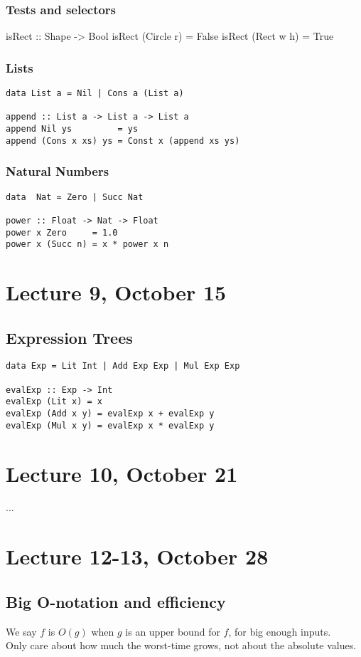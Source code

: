 \documentclass{article}
\begin{document}
\subsubsection{Tests and selectors}
isRect :: Shape -> Bool
isRect (Circle r) = False
isRect (Rect w h) = True
\subsubsection{Lists}
\begin{verbatim}
data List a = Nil | Cons a (List a)

append :: List a -> List a -> List a
append Nil ys         = ys
append (Cons x xs) ys = Const x (append xs ys)
\end{verbatim}
\subsubsection{Natural Numbers}
\begin{verbatim}
data  Nat = Zero | Succ Nat

power :: Float -> Nat -> Float
power x Zero     = 1.0
power x (Succ n) = x * power x n
\end{verbatim}
\section{Lecture 9, October 15}
\subsection{Expression Trees}
\begin{verbatim}
data Exp = Lit Int | Add Exp Exp | Mul Exp Exp

evalExp :: Exp -> Int
evalExp (Lit x) = x
evalExp (Add x y) = evalExp x + evalExp y
evalExp (Mul x y) = evalExp x * evalExp y
\end{verbatim}
\section{Lecture 10, October 21}
...
\section{Lecture 12-13, October 28}
\subsection{Big O-notation and efficiency}
We say $f$ is $O(g)$ when $g$ is an upper bound for $f$, for big enough inputs.\\
Only care about how much the worst-time grows, not about the absolute values.
\end{document}
